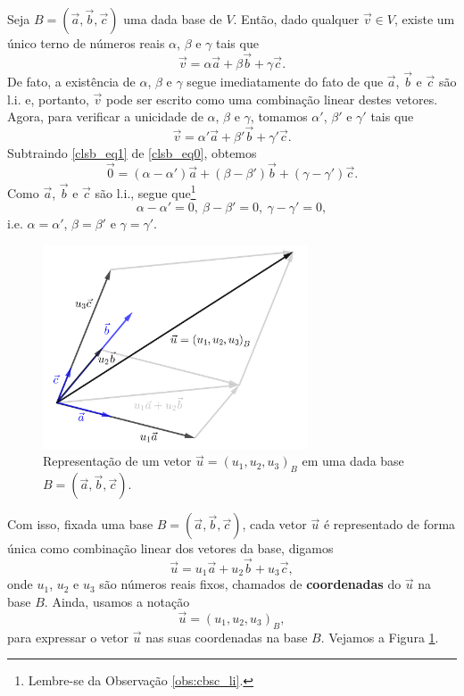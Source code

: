 Seja $B = (\vec{a}, \vec{b}, \vec{c})$ uma dada base de $V$. Então, dado qualquer $\vec{v}\in V$, existe um único terno de números reais $\alpha$, $\beta$ e $\gamma$ tais que
\begin{equation}
  \vec{v} = \alpha\vec{a} + \beta\vec{b} + \gamma\vec{c}.\label{clsb_eq0}
\end{equation}
De fato, a existência de $\alpha$, $\beta$ e $\gamma$ segue imediatamente do fato de que $\vec{a}$, $\vec{b}$ e $\vec{c}$ são l.i. e, portanto, $\vec{v}$ pode ser escrito como uma combinação linear destes vetores. Agora, para verificar a unicidade de $\alpha$, $\beta$ e $\gamma$, tomamos $\alpha'$, $\beta'$ e $\gamma'$ tais que
\begin{equation}
  \vec{v} = \alpha'\vec{a} + \beta'\vec{b} + \gamma'\vec{c}.\label{clsb_eq1}
\end{equation}
Subtraindo \eqref{clsb_eq1} de \eqref{clsb_eq0}, obtemos
\begin{equation}
  \vec{0} = (\alpha-\alpha')\vec{a}+(\beta-\beta')\vec{b}+(\gamma-\gamma')\vec{c}.
\end{equation}
Como $\vec{a}$, $\vec{b}$ e $\vec{c}$ são l.i., segue que\footnote{Lembre-se da Observação \ref{obs:cbsc_li}.}
\begin{equation}
  \alpha-\alpha'=0,~\beta-\beta'=0,~\gamma-\gamma'=0,
\end{equation}
i.e. $\alpha=\alpha'$, $\beta=\beta'$ e $\gamma=\gamma'$.

\begin{figure}[H]
  \centering
  \includegraphics[width=0.7\textwidth]{./cap_base/dados/fig_coord/fig_coord}
  \caption{Representação de um vetor $\vec{u} = (u_1, u_2, u_3)_B$ em uma dada base $B=(\vec{a},\vec{b},\vec{c})$.}
  \label{fig:coord}
\end{figure}

Com isso, fixada uma base $B = (\vec{a}, \vec{b}, \vec{c})$, cada vetor $\vec{u}$ é representado de forma única como combinação linear dos vetores da base, digamos
\begin{equation}
  \vec{u} = u_1\vec{a} + u_2\vec{b} + u_3\vec{c},
\end{equation}
onde $u_1$, $u_2$ e $u_3$ são números reais fixos, chamados de {\bf coordenadas} do $\vec{u}$ na base $B$. Ainda, usamos a notação
\begin{equation}
  \vec{u} = (u_1, u_2, u_3)_B,
\end{equation}
para expressar o vetor $\vec{u}$ nas suas coordenadas na base $B$. Vejamos a Figura \ref{fig:coord}.

